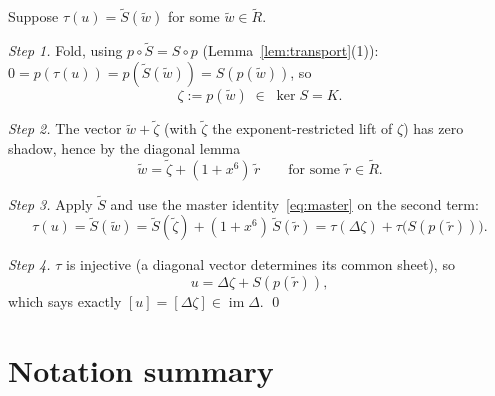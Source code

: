 \documentclass[11pt]{article}
\theoremstyle{plain}
\theoremstyle{definition}
\theoremstyle{remark}
\newcommand{\imD}{\operatorname{im}\Delta}
\newcommand{\Rcov}{\widetilde{R}}
\begin{document}
Suppose $\tau(u) = \widetilde S(\widetilde w)$ for some $\widetilde w \in
\Rcov$.

\emph{Step 1.} Fold, using $p \circ \widetilde S = S \circ p$
(Lemma~\ref{lem:transport}(1)): $0 = p(\tau(u)) = p(\widetilde S(\widetilde
w)) = S(p(\widetilde w))$, so
\[
\zeta := p(\widetilde w) \;\in\; \ker S = K .
\]

\emph{Step 2.} The vector $\widetilde w + \widetilde\zeta$ (with
$\widetilde\zeta$ the exponent-restricted lift of $\zeta$) has zero shadow,
hence by the diagonal lemma
\[
\widetilde w = \widetilde \zeta + (1 + x^6)\,\widetilde r
\qquad\text{for some } \widetilde r \in \Rcov .
\]

\emph{Step 3.} Apply $\widetilde S$ and use the master
identity~\eqref{eq:master} on the second term:
\[
\tau(u) = \widetilde S(\widetilde w)
= \widetilde S(\widetilde\zeta) + (1+x^6)\,\widetilde S(\widetilde r)
= \tau(\Delta\zeta) + \tau\bigl(S(p(\widetilde r))\bigr).
\]

\emph{Step 4.} $\tau$ is injective (a diagonal vector determines its common
sheet), so
\[
u = \Delta\zeta + S(p(\widetilde r)),
\]
which says exactly $[u] = [\Delta\zeta] \in \imD$. \qed

\section{Notation summary}
\end{document}
